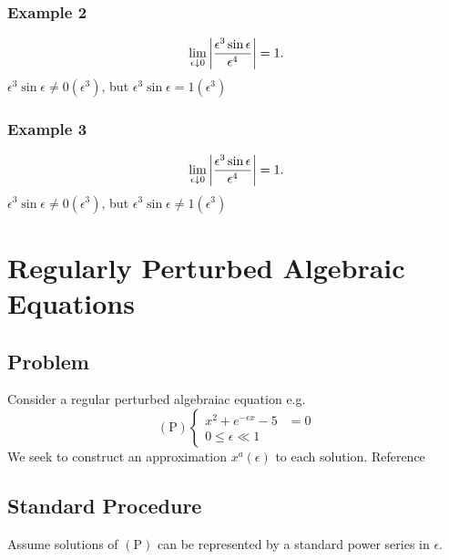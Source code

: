 \documentclass[12pt,twoside]{article}
\begin{document}
\subsubsection{Example 2}
$$\lim_{\epsilon\downarrow0}\left|{\frac{\epsilon^3\sin\epsilon}{\epsilon^4}}\right|=1.$$
$\epsilon^3\sin\epsilon\ne0(\epsilon^3)$, but $\epsilon^3\sin\epsilon=1(\epsilon^3)$
\subsubsection{Example 3}
$$\lim_{\epsilon\downarrow0}\left|{\frac{\epsilon^3\sin\epsilon}{\epsilon^4}}\right|=1.$$
$\epsilon^3\sin\epsilon\ne0(\epsilon^3)$, but $\epsilon^3\sin\epsilon\ne1(\epsilon^3)$

\section{}

\section{Regularly Perturbed Algebraic Equations}
\subsection{Problem}
Consider a regular perturbed algebraiac equation e.g.
\begin{equation}
  (\text{P}) \left\{
    \begin{aligned}
      x^2+e^{-\epsilon x} - 5 &= 0\\
      0 \le \epsilon \ll 1
    \end{aligned}
  \right.
\end{equation}
We seek to construct an approximation $x^{a}(\epsilon)$ to each solution.
Reference 
\subsection{Standard Procedure}
Assume solutions of $(\text{P})$ can be represented by a standard power series
in $\epsilon$.
\end{document}
